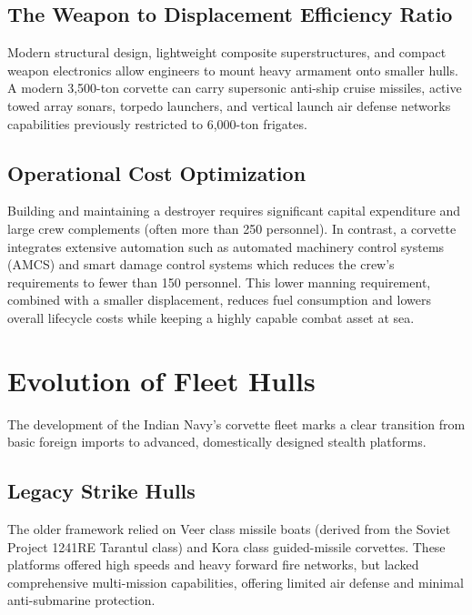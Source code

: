 \documentclass[12pt,a4paper,twoside]{report}
\begin{document}
\subsection{The Weapon to Displacement Efficiency Ratio}
Modern structural design, lightweight composite superstructures, and compact weapon electronics allow engineers to mount heavy armament onto smaller hulls. A modern 3,500-ton corvette can carry supersonic anti-ship cruise missiles, active towed array sonars, torpedo launchers, and vertical launch air defense networks capabilities previously restricted to 6,000-ton frigates.
\subsection{Operational Cost Optimization}
Building and maintaining a destroyer requires significant capital expenditure and large crew complements (often more than 250 personnel). In contrast, a corvette integrates extensive automation such as automated machinery control systems (AMCS) and smart damage control systems which reduces the crew's requirements to fewer than 150 personnel. This lower manning requirement, combined with a smaller displacement, reduces fuel consumption and lowers overall lifecycle costs while keeping a highly capable combat asset at sea.
\section{Evolution of Fleet Hulls}
The development of the Indian Navy's corvette fleet marks a clear transition from basic foreign imports to advanced, domestically designed stealth platforms.
\subsection{Legacy Strike Hulls}
The older framework relied on Veer class missile boats (derived from the Soviet Project 1241RE Tarantul class) and Kora class guided-missile corvettes. These platforms offered high speeds and heavy forward fire networks, but lacked comprehensive multi-mission capabilities, offering limited air defense and minimal anti-submarine protection.
\end{document}
